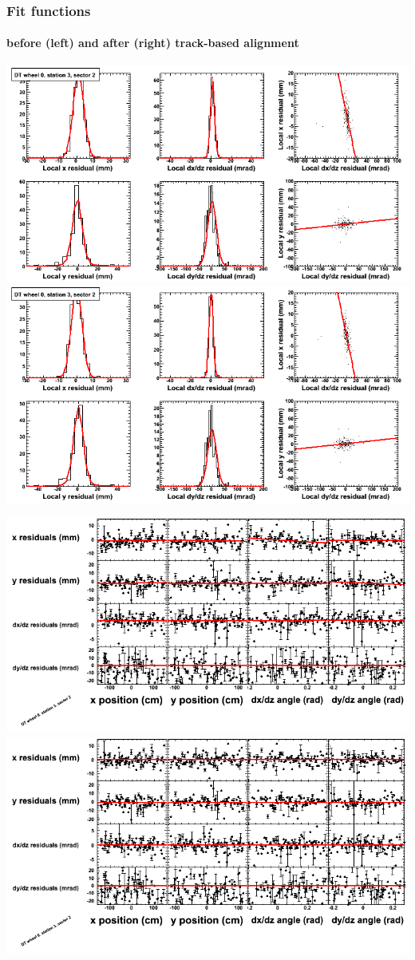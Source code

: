 \documentclass[compress]{beamer}
\begin{document}
\begin{frame}
\frametitle{Fit functions}
\framesubtitle{before (left) and after (right) track-based alignment}
\includegraphics[width=0.5\linewidth]{fitfunctions_re01/MBwhCst3sec02_bellcurves.png} \includegraphics[width=0.5\linewidth]{fitfunctions_re05/MBwhCst3sec02_bellcurves.png}

\includegraphics[width=0.5\linewidth]{fitfunctions_re01/MBwhCst3sec02_polynomials.png} \includegraphics[width=0.5\linewidth]{fitfunctions_re05/MBwhCst3sec02_polynomials.png}
\end{frame}
\end{document}
